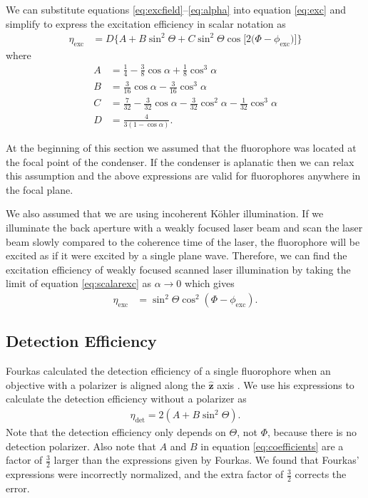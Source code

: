 \documentclass[10pt]{article}
\providecommand{\mh}[1]{\mathbf{\hat{#1}}}
\begin{document}
We can substitute equations \ref{eq:excfield}--\ref{eq:alpha} into equation
\ref{eq:exc} and simplify to express the excitation efficiency in scalar notation as
\begin{align}
  \eta_{\text{exc}} &= D\{A + B\sin^{2}{\Theta} + C\sin^{2}{\Theta} \cos{[2 (\Phi - \phi_{\text{exc}}})]\}\label{eq:scalarexc}
\end{align}
where
\begin{subequations}
\begin{align}
  A &= \frac{1}{4} - \frac{3}{8} \cos{\alpha } + \frac{1}{8} \cos^{3}{\alpha }\\
  B &= \frac{3}{16} \cos{\alpha } - \frac{3}{16} \cos^{3}{\alpha }\\
  C &= \frac{7}{32} - \frac{3}{32} \cos{\alpha } - \frac{3}{32} \cos^{2}{\alpha } - \frac{1}{32} \cos^{3}{\alpha}\\
  D &= \frac{4}{3(1 - \cos\alpha)}.
\end{align}\label{eq:coefficients}%
\end{subequations}

At the beginning of this section we assumed that the fluorophore was located at
the focal point of the condenser. If the condenser is aplanatic then we can
relax this assumption and the above expressions are valid for fluorophores anywhere
in the focal plane.

We also assumed that we are using incoherent K\"ohler illumination. If we
illuminate the back aperture with a weakly focused laser beam and scan the laser
beam slowly compared to the coherence time of the laser, the fluorophore will be
excited as if it were excited by a single plane wave. Therefore, we can find the
excitation efficiency of weakly focused scanned laser illumination by taking the
limit of equation \ref{eq:scalarexc} as $\alpha \rightarrow 0$ which gives
\begin{align*}
  \eta_{\text{exc}} &= \sin^2\Theta\cos^2(\Phi - \phi_{\text{exc}}).
\end{align*}

\subsection{Detection Efficiency}\label{detection}
Fourkas calculated the detection efficiency of a single fluorophore when an
objective with a polarizer is aligned along the $\mh{z}$ axis
\cite{fourkas2001}. We use his expressions to calculate the detection efficiency
without a polarizer as
\begin{align}
  \eta_{\text{det}} = 2(A + B\sin^2\Theta). \label{eq:scalardet}
\end{align}
Note that the detection efficiency only depends on $\Theta$, not $\Phi$, because
there is no detection polarizer. Also note that $A$ and $B$ in equation
\ref{eq:coefficients} are a factor of $\frac{3}{2}$ larger than the expressions
given by Fourkas. We found that Fourkas' expressions were incorrectly
normalized, and the extra factor of $\frac{3}{2}$ corrects the error.
\end{document}
